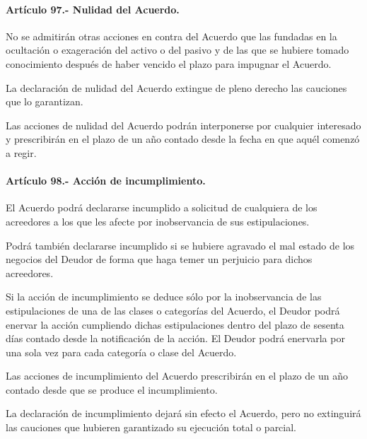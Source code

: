 \documentclass[
]{book}
\begin{document}
\hypertarget{artuxedculo-97.--nulidad-del-acuerdo.}{%
\paragraph*{Artículo 97.- Nulidad del Acuerdo.}\label{artuxedculo-97.--nulidad-del-acuerdo.}}

No se admitirán otras acciones en contra del Acuerdo que las fundadas en la ocultación o exageración del activo o del pasivo y de las que se hubiere tomado conocimiento después de haber vencido el plazo para impugnar el Acuerdo.

La declaración de nulidad del Acuerdo extingue de pleno derecho las cauciones que lo garantizan.

Las acciones de nulidad del Acuerdo podrán interponerse por cualquier interesado y prescribirán en el plazo de un año contado desde la fecha en que aquél comenzó a regir.

\hypertarget{artuxedculo-98.--acciuxf3n-de-incumplimiento.}{%
\paragraph*{Artículo 98.- Acción de incumplimiento.}\label{artuxedculo-98.--acciuxf3n-de-incumplimiento.}}

El Acuerdo podrá declararse incumplido a solicitud de cualquiera de los acreedores a los que les afecte por inobservancia de sus estipulaciones.

Podrá también declararse incumplido si se hubiere agravado el mal estado de los negocios del Deudor de forma que haga temer un perjuicio para dichos acreedores.

Si la acción de incumplimiento se deduce sólo por la inobservancia de las estipulaciones de una de las clases o categorías del Acuerdo, el Deudor podrá enervar la acción cumpliendo dichas estipulaciones dentro del plazo de sesenta días contado desde la notificación de la acción. El Deudor podrá enervarla por una sola vez para cada categoría o clase del Acuerdo.

Las acciones de incumplimiento del Acuerdo prescribirán en el plazo de un año contado desde que se produce el incumplimiento.

La declaración de incumplimiento dejará sin efecto el Acuerdo, pero no extinguirá las cauciones que hubieren garantizado su ejecución total o parcial.
\end{document}
